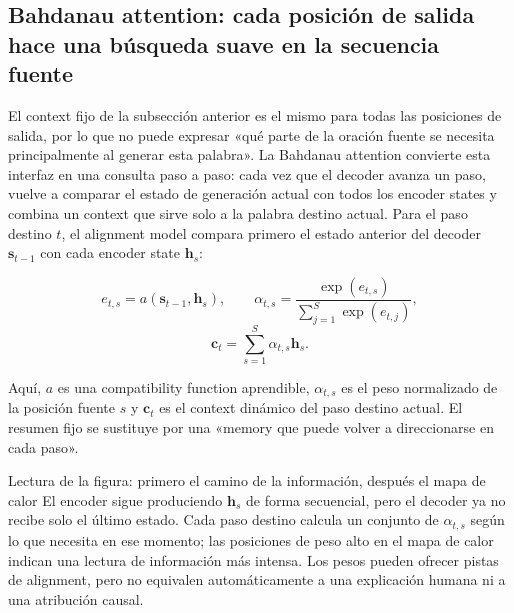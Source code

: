 \subsection{Bahdanau attention: cada posición de salida hace una búsqueda suave en la secuencia fuente}

El context fijo de la subsección anterior es el mismo para todas las posiciones de salida, por lo que no puede expresar «qué parte de la oración fuente se necesita principalmente al generar esta palabra». La Bahdanau attention convierte esta interfaz en una consulta paso a paso: cada vez que el decoder avanza un paso, vuelve a comparar el estado de generación actual con todos los encoder states y combina un context que sirve solo a la palabra destino actual. Para el paso destino $t$, el alignment model compara primero el estado anterior del decoder $\mathbf s_{t-1}$ con cada encoder state $\mathbf h_s$:

\[
e_{t,s}=a(\mathbf s_{t-1},\mathbf h_s),\qquad
\alpha_{t,s}=\frac{\exp(e_{t,s})}{\sum_{j=1}^{S}\exp(e_{t,j})},
\]
\[
\mathbf c_t=\sum_{s=1}^{S}\alpha_{t,s}\mathbf h_s.
\]

Aquí, $a$ es una compatibility function aprendible, $\alpha_{t,s}$ es el peso normalizado de la posición fuente $s$ y $\mathbf c_t$ es el context dinámico del paso destino actual. El resumen fijo se sustituye por una «memory que puede volver a direccionarse en cada paso».


\begin{knowledgebox}{Lectura de la figura: primero el camino de la información, después el mapa de calor}
El encoder sigue produciendo $\mathbf h_s$ de forma secuencial, pero el decoder ya no recibe solo el último estado. Cada paso destino calcula un conjunto de $\alpha_{t,s}$ según lo que necesita en ese momento; las posiciones de peso alto en el mapa de calor indican una lectura de información más intensa. Los pesos pueden ofrecer pistas de alignment, pero no equivalen automáticamente a una explicación humana ni a una atribución causal.
\end{knowledgebox}


